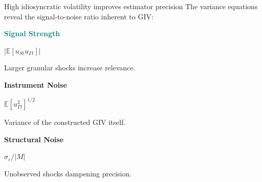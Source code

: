 \documentclass[aspectratio=169,11pt]{beamer}
\begin{document}
\begin{frame}{High idiosyncratic volatility improves estimator precision}
    \vspace{0.5cm}
    \centering
    The variance equations reveal the signal-to-noise ratio inherent to GIV:

    \vspace{0.8cm}
    \begin{minipage}{0.3\textwidth}
        \centering
        \textcolor{Teal}{\textbf{Signal Strength}}

        \vspace{0.2cm}
        $|\mathbb{E}[u_{St} u_{\Gamma t}]|$

        \vspace{0.2cm}
        Larger granular shocks increase relevance.
    \end{minipage}
    \hfill
    \begin{minipage}{0.3\textwidth}
        \centering
        \textcolor{WarmOrange}{\textbf{Instrument Noise}}

        \vspace{0.2cm}
        $\mathbb{E}[u_{\Gamma t}^2]^{1/2}$

        \vspace{0.2cm}
        Variance of the constructed GIV itself.
    \end{minipage}
    \hfill
    \begin{minipage}{0.3\textwidth}
        \centering
        \textcolor{SoftPurple}{\textbf{Structural Noise}}

        \vspace{0.2cm}
        $\sigma_{\varepsilon} / |M|$

        \vspace{0.2cm}
        Unobserved shocks dampening precision.
    \end{minipage}
    \vspace{0.1cm}
    \hfill \hyperlink{src_propositions}{}
\end{frame}
\end{document}
